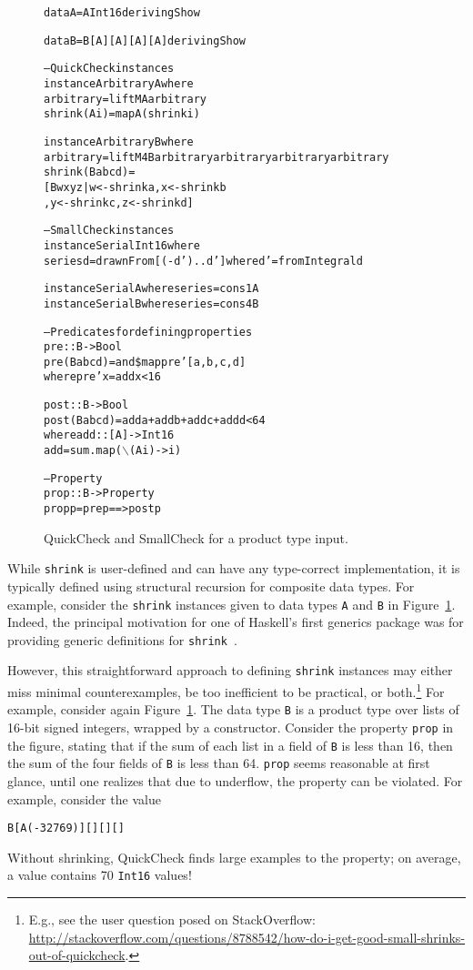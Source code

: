 \documentclass[9pt]{sigplanconf}
\newenvironment{code}{\begin{alltt}\scriptsize}{\end{alltt}}
\newcommand{\ttp}[1]{\texttt{#1}}
\begin{document}
\begin{figure}[ht]
\begin{code}
data A = A Int16 deriving Show

data B = B [A] [A] [A] [A] deriving Show

-- QuickCheck instances
instance Arbitrary A where
  arbitrary    = liftM A arbitrary
  shrink (A i) = map A (shrink i)

instance Arbitrary B where
  arbitrary = liftM4 B arbitrary arbitrary arbitrary arbitrary
  shrink (B a b c d) = 
    [ B w x y z | w <- shrink a, x <- shrink b
                , y <- shrink c, z <- shrink d ]

-- SmallCheck instances
instance Serial Int16 where
  series d = drawnFrom [(-d')..d'] where d' = fromIntegral d

instance Serial A where series = cons1 A 
instance Serial B where series = cons4 B

-- Predicates for defining properties
pre :: B -> Bool
pre (B a b c d) = and \$ map pre' [a, b, c, d]
  where pre' x = add x < 16
  
post :: B -> Bool
post (B a b c d) = add a + add b + add c + add d < 64
  where add :: [A] -> Int16
        add = sum . map (\(\backslash\)(A i) -> i)

-- Property
prop :: B -> Property
prop p = pre p ==> post p
\end{code}
  \caption{QuickCheck and SmallCheck for a product type input.}
  \label{fig:initial}
\end{figure}

While \ttp{shrink} is user-defined and can have any type-correct implementation,
it is typically defined using structural recursion for composite data types.
For example, consider the \ttp{shrink} instances given to data types \ttp{A} and
\ttp{B} in Figure~\ref{fig:initial}.  Indeed, the principal motivation for one
of Haskell's first generics package was for providing generic definitions for
\ttp{shrink}~\cite{syb}.

However, this straightforward approach to defining \ttp{shrink} instances may
either miss minimal counterexamples, be too inefficient to be practical, or
both.\footnote{E.g., see the user question posed on StackOverflow:
  \url{http://stackoverflow.com/questions/8788542/how-do-i-get-good-small-shrinks-out-of-quickcheck}.}
For example, consider again Figure~\ref{fig:initial}.  The data type \ttp{B} is
a product type over lists of 16-bit signed integers, wrapped by a constructor.
Consider the property \ttp{prop} in the figure, stating that if the sum of each
list in a field of \ttp{B} is less than 16, then the sum of the four fields of
\ttp{B} is less than 64.  \ttp{prop} seems reasonable at first glance, until
one realizes that due to underflow, the property can be violated.  For example,
consider the value
%
\begin{code}
B [A (-32769)] [] [] []
\end{code}
%
\noindent
Without shrinking, QuickCheck finds large examples to the property; on average,
a value contains 70 \ttp{Int16} values!
\end{document}
